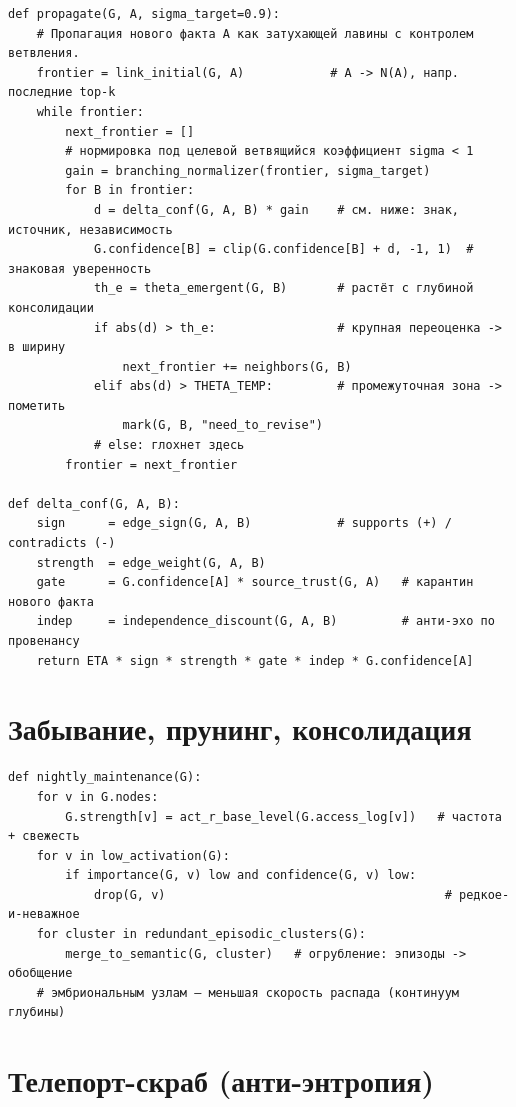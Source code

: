 \begin{lstlisting}[style=pseudo]
def propagate(G, A, sigma_target=0.9):
    # Пропагация нового факта A как затухающей лавины с контролем ветвления.
    frontier = link_initial(G, A)            # A -> N(A), напр. последние top-k
    while frontier:
        next_frontier = []
        # нормировка под целевой ветвящийся коэффициент sigma < 1
        gain = branching_normalizer(frontier, sigma_target)
        for B in frontier:
            d = delta_conf(G, A, B) * gain    # см. ниже: знак, источник, независимость
            G.confidence[B] = clip(G.confidence[B] + d, -1, 1)  # знаковая уверенность
            th_e = theta_emergent(G, B)       # растёт с глубиной консолидации
            if abs(d) > th_e:                 # крупная переоценка -> в ширину
                next_frontier += neighbors(G, B)
            elif abs(d) > THETA_TEMP:         # промежуточная зона -> пометить
                mark(G, B, "need_to_revise")
            # else: глохнет здесь
        frontier = next_frontier

def delta_conf(G, A, B):
    sign      = edge_sign(G, A, B)            # supports (+) / contradicts (-)
    strength  = edge_weight(G, A, B)
    gate      = G.confidence[A] * source_trust(G, A)   # карантин нового факта
    indep     = independence_discount(G, A, B)         # анти-эхо по провенансу
    return ETA * sign * strength * gate * indep * G.confidence[A]
\end{lstlisting}

\section{Забывание, прунинг, консолидация}

\begin{lstlisting}[style=pseudo]
def nightly_maintenance(G):
    for v in G.nodes:
        G.strength[v] = act_r_base_level(G.access_log[v])   # частота + свежесть
    for v in low_activation(G):
        if importance(G, v) low and confidence(G, v) low:
            drop(G, v)                                       # редкое-и-неважное
    for cluster in redundant_episodic_clusters(G):
        merge_to_semantic(G, cluster)   # огрубление: эпизоды -> обобщение
    # эмбриональным узлам — меньшая скорость распада (континуум глубины)
\end{lstlisting}

\section{Телепорт-скраб (анти-энтропия)}

